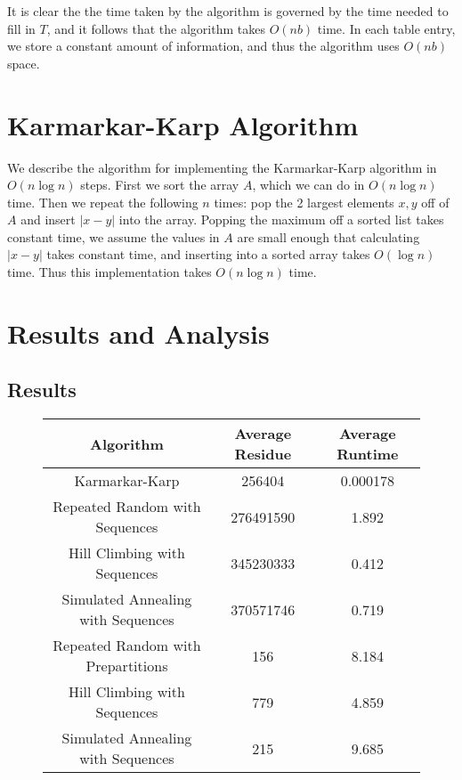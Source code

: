 \documentclass[10pt,letter]{article}
\begin{document}
It is clear the the time taken by the algorithm is governed by the time needed to fill in $T$, and it follows that the algorithm takes $O(nb)$ time. In each table entry, we store a constant amount of information, and thus the algorithm uses $O(nb)$ space. 

\section{Karmarkar-Karp Algorithm}

We describe the algorithm for implementing the Karmarkar-Karp algorithm in $O(n\log{n})$ steps. First we sort the array $A$, which we can do in $O(n\log{n})$ time. Then we repeat the following $n$ times: pop the 2 largest elements $x,y$ off of $A$ and insert $|x-y|$ into the array. Popping the maximum off a sorted list takes constant time, we assume the values in $A$ are small enough that calculating $|x-y|$ takes constant time, and inserting into a sorted array takes $O(\log{n})$ time. Thus this implementation takes $O(n\log{n})$ time.

\section{Results and Analysis}

\subsection{Results}

\begin{figure}[h]
  \centering
  \begin{tabular}{|c|c|c|}
    \hline
    Algorithm & Average Residue & Average Runtime \\
    \hline
    Karmarkar-Karp & 256404 & 0.000178 \\
    \hline
    Repeated Random with Sequences & 276491590 & 1.892 \\
    \hline
    Hill Climbing with Sequences & 345230333 & 0.412 \\
    \hline
    Simulated Annealing with Sequences & 370571746 & 0.719 \\
    \hline
    Repeated Random with Prepartitions & 156 & 8.184 \\
    \hline
    Hill Climbing with Sequences & 779 & 4.859 \\
    \hline
    Simulated Annealing with Sequences & 215 & 9.685 \\
    \hline
    
  \end{tabular}
\end{figure}
\end{document}
